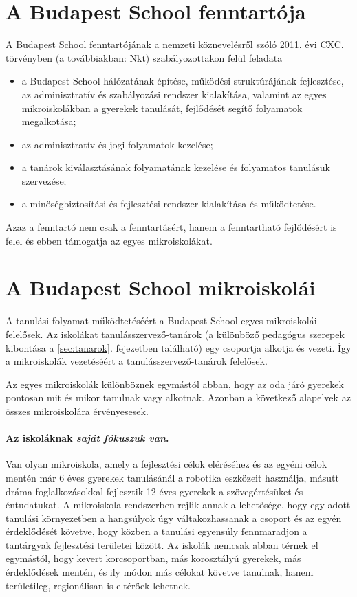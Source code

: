   \section{A Budapest School fenntartója}
  A Budapest School fenntartójának a nemzeti köznevelésről szóló 2011. évi CXC. törvényben (a továbbiakban: Nkt)  szabályozottakon felül feladata
  \begin{itemize}
  \item a Budapest School hálózatának építése, működési struktúrájának
  fejlesztése, az adminisztratív és szabályozási rendszer kialakítása,
  valamint az egyes mikroiskolákban a gyerekek tanulását, fejlődését segítő folyamatok megalkotása;
  \item  az adminisztratív és jogi folyamatok kezelése;
  \item  a tanárok kiválasztásának folyamatának kezelése és folyamatos tanulásuk szervezése;
  \item a minőségbiztosítási és fejlesztési rendszer kialakítása és működtetése.
\end{itemize}

 Azaz a fenntartó nem csak a fenntartásért, hanem a fenntartható fejlődésért is felel és ebben támogatja az egyes mikroiskolákat.

  \section{A Budapest School mikroiskolái}

  A tanulási folyamat működtetéséért a Budapest School egyes mikroiskolái
  felelősek. Az iskolákat tanulásszervező-tanárok (a különböző pedagógus szerepek kibontása a \ref{sec:tanarok}. fejezetben található) egy csoportja alkotja és vezeti. Így a
  mikroiskolák vezetéséért a tanulásszervező-tanárok felelősek.

  Az egyes mikroiskolák különböznek egymástól abban, hogy az oda járó gyerekek pontosan mit és mikor
  tanulnak vagy alkotnak. Azonban a következő alapelvek az összes mikroiskolára
  érvényesesek.

\paragraph{Az iskoláknak \emph{saját fókuszuk van}.}

    Van olyan mikroiskola, amely a fejlesztési célok eléréséhez és az egyéni célok
    mentén már 6 éves gyerekek tanulásánál a robotika eszközeit használja,
    másutt dráma foglalkozásokkal fejlesztik 12 éves gyerekek a szövegértésüket és
    éntudatukat. A
    mikroiskola-rendszerben rejlik annak a lehetősége, hogy egy adott tanulási
    környezetben a hangsúlyok úgy váltakozhassanak a csoport és az egyén
    érdeklődését követve, hogy közben a tanulási egyensúly fennmaradjon a
    tantárgyak fejlesztési területei között. Az iskolák nemcsak abban térnek el
    egymástól, hogy kevert korcsoportban, más korosztályú gyerekek, más
    érdeklődések mentén, és ily módon más célokat követve tanulnak, hanem
    területileg, regionálisan is eltérőek lehetnek.


